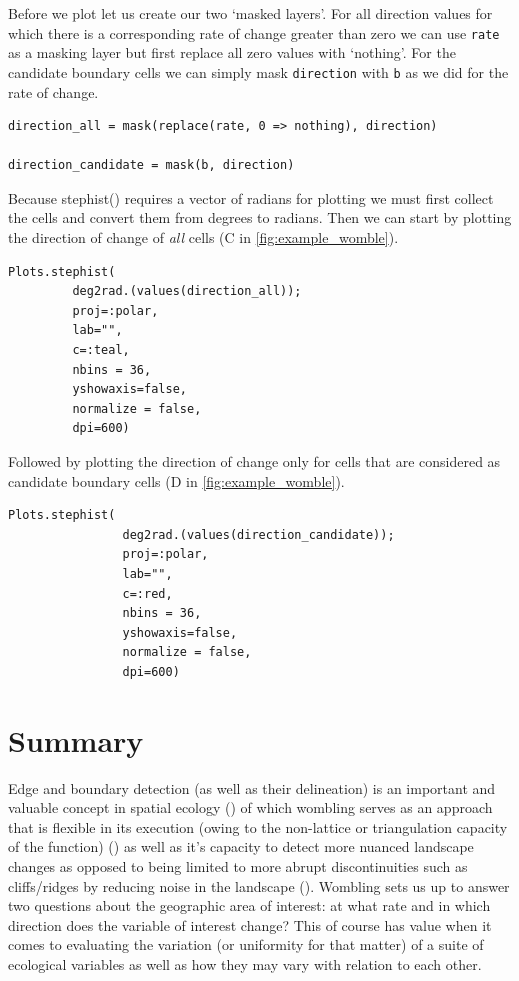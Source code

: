 \begin{refsection}
Before we plot let us create our two `masked layers'. For all direction
values for which there is a corresponding rate of change greater than
zero we can use \texttt{rate} as a masking layer but first replace all
zero values with `nothing'. For the candidate boundary cells we can
simply mask \texttt{direction} with \texttt{b} as we did for the rate of
change.

\begin{verbatim}
direction_all = mask(replace(rate, 0 => nothing), direction)

direction_candidate = mask(b, direction)
\end{verbatim}

Because stephist() requires a vector of radians for plotting we must
first collect the cells and convert them from degrees to radians. Then
we can start by plotting the direction of change of \emph{all} cells (C
in \autoref{fig:example_womble}).

\begin{verbatim}
Plots.stephist(
         deg2rad.(values(direction_all));
         proj=:polar,
         lab="",
         c=:teal,
         nbins = 36,
         yshowaxis=false,
         normalize = false,
         dpi=600)
\end{verbatim}

Followed by plotting the direction of change only for cells that are
considered as candidate boundary cells (D in \autoref{fig:example_womble}).

\begin{verbatim}
Plots.stephist(
                deg2rad.(values(direction_candidate));
                proj=:polar,
                lab="",
                c=:red,
                nbins = 36,
                yshowaxis=false,
                normalize = false,
                dpi=600)
\end{verbatim}

\section{Summary}\label{summary}

Edge and boundary detection (as well as their delineation) is an
important and valuable concept in spatial ecology
(\cite{Cadenasso2003FraThe}) of which wombling serves as an approach that
is flexible in its execution (owing to the non-lattice or triangulation
capacity of the function) (\cite{Fortin2005SpaAna, Fortin1994EdgDet}) as
well as it's capacity to detect more nuanced landscape changes as
opposed to being limited to more abrupt discontinuities such as
cliffs/ridges by reducing noise in the landscape
(\cite{Matchev2020FinWom}). Wombling sets us up to answer two questions
about the geographic area of interest: at what rate and in which
direction does the variable of interest change? This of course has value
when it comes to evaluating the variation (or uniformity for that
matter) of a suite of ecological variables as well as how they may vary
with relation to each other.


\end{refsection}
